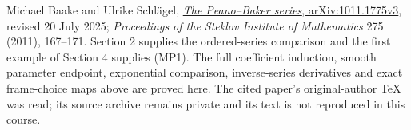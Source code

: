 \documentclass[
  11pt,
]{article}
\begin{document}
Michael Baake and Ulrike Schlägel,
\href{https://arxiv.org/abs/1011.1775v3}{\emph{The Peano--Baker series},
arXiv:1011.1775v3}, revised 20 July 2025; \emph{Proceedings of the
Steklov Institute of Mathematics} 275 (2011), 167--171. Section 2
supplies the ordered-series comparison and the first example of Section
4 supplies (MP1). The full coefficient induction, smooth parameter
endpoint, exponential comparison, inverse-series derivatives and exact
frame-choice maps above are proved here. The cited paper's
original-author TeX was read; its source archive remains private and its
text is not reproduced in this
course.
\end{document}
